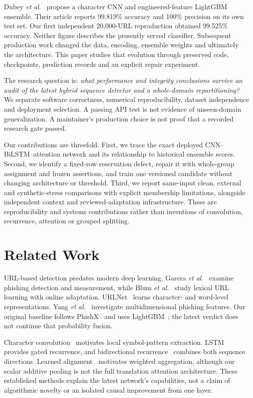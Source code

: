 \documentclass[conference,a4paper]{IEEEtran}
\begin{document}
Dubey \emph{et al.}~\cite{phishx} propose a character CNN and engineered-feature LightGBM ensemble. Their article reports 99.819\% accuracy and 100\% precision on its own test set. Our first independent 20,000-URL reproduction obtained 99.525\% accuracy. Neither figure describes the presently served classifier. Subsequent production work changed the data, encoding, ensemble weights and ultimately the architecture. This paper studies that evolution through preserved code, checkpoints, prediction records and an explicit repair experiment.

The research question is: \emph{what performance and integrity conclusions survive an audit of the latest hybrid sequence detector and a whole-domain repartitioning?} We separate software correctness, numerical reproducibility, dataset independence and deployment selection. A passing API test is not evidence of unseen-domain generalization. A maintainer's production choice is not proof that a recorded research gate passed.

Our contributions are threefold. First, we trace the exact deployed CNN--BiLSTM--attention network and its relationship to historical ensemble scores. Second, we identify a fixed-row reservation defect, repair it with whole-group assignment and frozen assertions, and train one versioned candidate without changing architecture or threshold. Third, we report same-input clean, external and synthetic-stress comparisons with explicit membership limitations, alongside independent context and reviewed-adaptation infrastructure. These are reproducibility and systems contributions rather than inventions of convolution, recurrence, attention or grouped splitting.

\section{Related Work}
URL-based detection predates modern deep learning. Garera \emph{et al.}~\cite{garera} examine phishing detection and measurement, while Blum \emph{et al.}~\cite{blum} study lexical URL learning with online adaptation. URLNet~\cite{urlnet} learns character- and word-level representations. Yang \emph{et al.}~\cite{yang} investigate multidimensional phishing features. Our original baseline follows PhishX~\cite{phishx} and uses LightGBM~\cite{lightgbm}; the latest verdict does not continue that probability fusion.

Character convolution~\cite{charconv} motivates local symbol-pattern extraction. LSTM~\cite{lstm} provides gated recurrence, and bidirectional recurrence~\cite{brnn} combines both sequence directions. Learned alignment~\cite{attention} motivates weighted aggregation, although our scalar additive pooling is not the full translation attention architecture. These established methods explain the latest network's capabilities, not a claim of algorithmic novelty or an isolated causal improvement from one layer.
\end{document}
